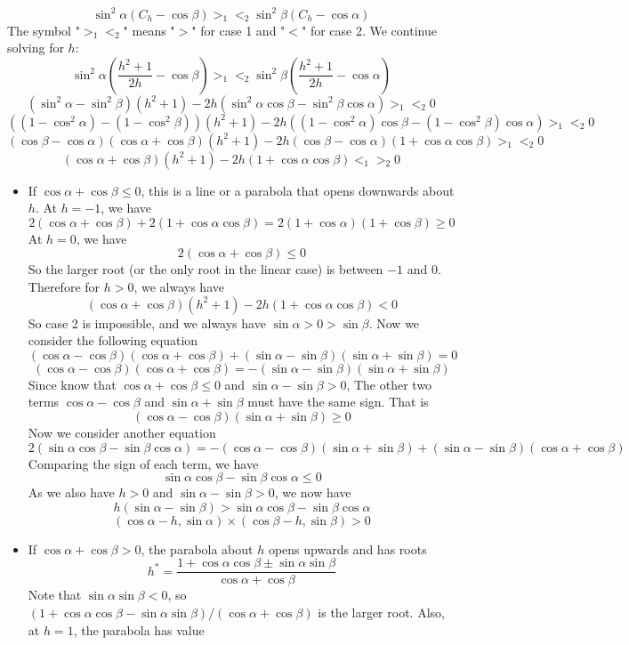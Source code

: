 \documentclass[]{article}
\begin{document}
\[
\sin^2\alpha(C_h-\cos\beta) >_1 <_2  \sin^2\beta(C_h-\cos\alpha)
\]
The symbol "$>_1 <_2$" means "$>$" for case 1 and "$<$" for case 2. We continue solving for $h$:
\[
\sin^2\alpha\left(\frac{h^2+1}{2h}-\cos\beta\right) >_1 <_2  \sin^2\beta\left(\frac{h^2+1}{2h}-\cos\alpha\right)
\]
\[
(\sin^2\alpha - \sin^2\beta)(h^2 + 1) - 2h(\sin^2\alpha\cos\beta - \sin^2\beta\cos\alpha)>_1 <_2 0
\]
\[
((1-\cos^2\alpha) - (1-\cos^2\beta))(h^2 + 1) - 2h((1-\cos^2\alpha)\cos\beta -(1-\cos^2\beta)\cos\alpha)>_1 <_2 0
\]
\[
(\cos\beta-\cos\alpha)(\cos\alpha+\cos\beta)(h^2 + 1) - 2h(\cos\beta-\cos\alpha)(1+\cos\alpha\cos\beta) >_1 <_2 0
\]
\[
(\cos\alpha+\cos\beta)(h^2 + 1) - 2h(1+\cos\alpha\cos\beta) <_1 >_2 0
\]
\begin{itemize}
\item If $\cos\alpha+\cos\beta \le 0$, this is a line or a parabola that opens downwards about $h$. At $h = -1$, we have
\[
2(\cos\alpha+\cos\beta) + 2(1+\cos\alpha\cos\beta) = 2(1+\cos\alpha)(1+\cos\beta) \ge 0
\]
At $h = 0$, we have 
\[
2(\cos\alpha+\cos\beta) \le 0
\]
So the larger root (or the only root in the linear case) is between $-1$ and $0$. Therefore for $h > 0$, we always have
\[
(\cos\alpha+\cos\beta)(h^2 + 1) - 2h(1+\cos\alpha\cos\beta) < 0
\]
So case 2 is impossible, and we always have $\sin\alpha > 0 > \sin\beta$. Now we consider the following equation
\[
(\cos\alpha-\cos\beta)(\cos\alpha+\cos\beta) + (\sin\alpha-\sin\beta)(\sin\alpha+\sin\beta) = 0
\]
\[
(\cos\alpha-\cos\beta)(\cos\alpha+\cos\beta) = -(\sin\alpha-\sin\beta)(\sin\alpha+\sin\beta)
\]
Since know that $\cos\alpha+\cos\beta \le 0$ and $\sin\alpha-\sin\beta > 0$, The other two terms $\cos\alpha-\cos\beta$ and $\sin\alpha+\sin\beta$ must have the same sign. That is
\[
(\cos\alpha-\cos\beta)(\sin\alpha+\sin\beta) \ge 0
\]
Now we consider another equation
\[
2(\sin\alpha\cos\beta - \sin\beta\cos\alpha) = -(\cos\alpha-\cos\beta)(\sin\alpha + \sin\beta) + (\sin\alpha - \sin\beta)(\cos\alpha+\cos\beta)
\]
Comparing the sign of each term, we have 
\[
	\sin\alpha\cos\beta - \sin\beta\cos\alpha \le 0
\]
As we also have $h > 0$ and $\sin\alpha - \sin\beta > 0$, we now have
\[
	h(\sin\alpha - \sin\beta) > \sin\alpha\cos\beta - \sin\beta\cos\alpha
\]
\[
(\cos\alpha-h, \sin\alpha)\times(\cos\beta-h, \sin\beta) > 0
\]
\item If $\cos\alpha+\cos\beta > 0$, the parabola about $h$ opens upwards and has roots
\[
h^* = \frac{1 + \cos \alpha\cos \beta\pm \sin \alpha\sin\beta}{\cos\alpha + \cos\beta} 
\]
Note that $\sin\alpha\sin\beta < 0$, so $(1 + \cos \alpha\cos \beta- \sin \alpha\sin\beta)/(\cos\alpha + \cos\beta)$ is the larger root. Also, at $h = 1$, the parabola has value

\end{itemize}
\end{document}
